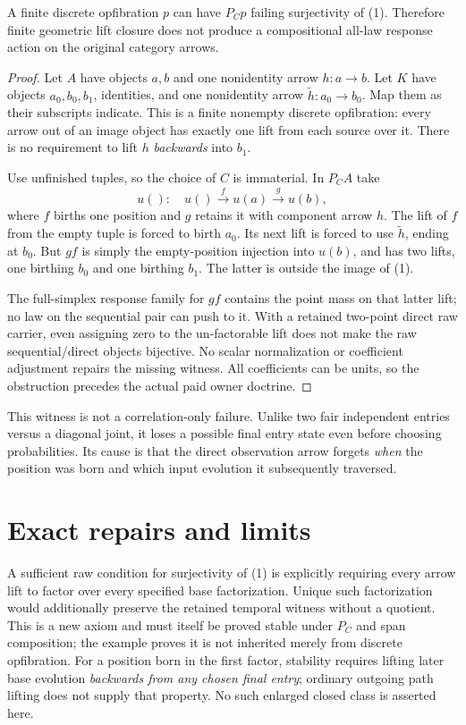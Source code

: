 \documentclass[11pt]{article}
\begin{document}
\begin{proposition}
A finite discrete opfibration $p$ can have $P_Cp$ failing surjectivity of (1). Therefore finite geometric lift closure does not produce a compositional all-law response action on the original category arrows.
\end{proposition}
\begin{proof}
Let $A$ have objects $a,b$ and one nonidentity arrow $h:a\to b$. Let $K$ have objects $a_0,b_0,b_1$, identities, and one nonidentity arrow $\widetilde h:a_0\to b_0$. Map them as their subscripts indicate. This is a finite nonempty discrete opfibration: every arrow out of an image object has exactly one lift from each source over it. There is no requirement to lift $h$ \emph{backwards} into $b_1$.

Use unfinished tuples, so the choice of $C$ is immaterial. In $P_CA$ take
\[
 u():\quad u()\xrightarrow f u(a)\xrightarrow g u(b),
\]
where $f$ births one position and $g$ retains it with component arrow $h$. The lift of $f$ from the empty tuple is forced to birth $a_0$. Its next lift is forced to use $\widetilde h$, ending at $b_0$. But $gf$ is simply the empty-position injection into $u(b)$, and has two lifts, one birthing $b_0$ and one birthing $b_1$. The latter is outside the image of (1).

The full-simplex response family for $gf$ contains the point mass on that latter lift; no law on the sequential pair can push to it. With a retained two-point direct raw carrier, even assigning zero to the un-factorable lift does not make the raw sequential/direct objects bijective. No scalar normalization or coefficient adjustment repairs the missing witness. All coefficients can be units, so the obstruction precedes the actual paid owner doctrine.\end{proof}

This witness is not a correlation-only failure. Unlike two fair independent entries versus a diagonal joint, it loses a possible final entry state even before choosing probabilities. Its cause is that the direct observation arrow forgets \emph{when} the position was born and which input evolution it subsequently traversed.

\section{Exact repairs and limits}
A sufficient raw condition for surjectivity of (1) is explicitly requiring every arrow lift to factor over every specified base factorization. Unique such factorization would additionally preserve the retained temporal witness without a quotient. This is a new axiom and must itself be proved stable under $P_C$ and span composition; the example proves it is not inherited merely from discrete opfibration. For a position born in the first factor, stability requires lifting later base evolution \emph{backwards from any chosen final entry}; ordinary outgoing path lifting does not supply that property. No such enlarged closed class is asserted here.
\end{document}
